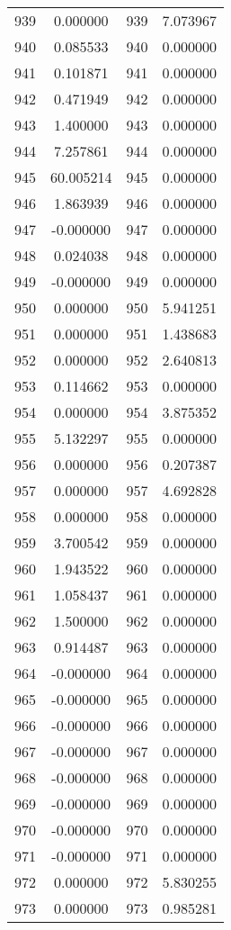 \documentclass[12pt]{article}
\begin{document}
\begin{longtable}{@{}cccc@{}}
939 & 0.000000 & 939 & 7.073967 \\
940 & 0.085533 & 940 & 0.000000 \\
941 & 0.101871 & 941 & 0.000000 \\
942 & 0.471949 & 942 & 0.000000 \\
943 & 1.400000 & 943 & 0.000000 \\
944 & 7.257861 & 944 & 0.000000 \\
945 & 60.005214 & 945 & 0.000000 \\
946 & 1.863939 & 946 & 0.000000 \\
947 & -0.000000 & 947 & 0.000000 \\
948 & 0.024038 & 948 & 0.000000 \\
949 & -0.000000 & 949 & 0.000000 \\
950 & 0.000000 & 950 & 5.941251 \\
951 & 0.000000 & 951 & 1.438683 \\
952 & 0.000000 & 952 & 2.640813 \\
953 & 0.114662 & 953 & 0.000000 \\
954 & 0.000000 & 954 & 3.875352 \\
955 & 5.132297 & 955 & 0.000000 \\
956 & 0.000000 & 956 & 0.207387 \\
957 & 0.000000 & 957 & 4.692828 \\
958 & 0.000000 & 958 & 0.000000 \\
959 & 3.700542 & 959 & 0.000000 \\
960 & 1.943522 & 960 & 0.000000 \\
961 & 1.058437 & 961 & 0.000000 \\
962 & 1.500000 & 962 & 0.000000 \\
963 & 0.914487 & 963 & 0.000000 \\
964 & -0.000000 & 964 & 0.000000 \\
965 & -0.000000 & 965 & 0.000000 \\
966 & -0.000000 & 966 & 0.000000 \\
967 & -0.000000 & 967 & 0.000000 \\
968 & -0.000000 & 968 & 0.000000 \\
969 & -0.000000 & 969 & 0.000000 \\
970 & -0.000000 & 970 & 0.000000 \\
971 & -0.000000 & 971 & 0.000000 \\
972 & 0.000000 & 972 & 5.830255 \\
973 & 0.000000 & 973 & 0.985281 \\

\end{longtable}
\end{document}
